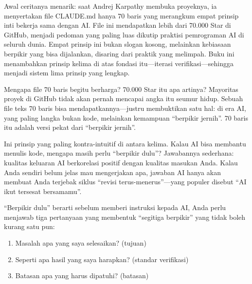 

Awal ceritanya menarik: saat Andrej Karpathy membuka proyeknya, ia menyertakan file CLAUDE.md hanya 70 baris yang merangkum empat prinsip inti bekerja sama dengan AI. File ini mendapatkan lebih dari 70.000 Star di GitHub, menjadi pedoman yang paling luas dikutip praktisi pemrograman AI di seluruh dunia. Empat prinsip ini bukan slogan kosong, melainkan kebiasaan berpikir yang bisa dijalankan, disaring dari praktik yang melimpah. Buku ini menambahkan prinsip kelima di atas fondasi itu—iterasi verifikasi—sehingga menjadi sistem lima prinsip yang lengkap.

\begin{tcbinfo}{Mengapa file 70 baris begitu berharga?}
70.000 Star itu apa artinya? Mayoritas proyek di GitHub tidak akan pernah mencapai angka itu seumur hidup. Sebuah file teks 70 baris bisa mendapatkannya—justru membuktikan satu hal: di era AI, yang paling langka bukan kode, melainkan kemampuan “berpikir jernih”. 70 baris itu adalah versi pekat dari “berpikir jernih”.

\end{tcbinfo}


Ini prinsip yang paling kontra-intuitif di antara kelima. Kalau AI bisa membantu menulis kode, mengapa masih perlu “berpikir dulu”? Jawabannya sederhana: kualitas keluaran AI berkorelasi positif dengan kualitas masukan Anda. Kalau Anda sendiri belum jelas mau mengerjakan apa, jawaban AI hanya akan membuat Anda terjebak siklus “revisi terus-menerus”—yang populer disebut “AI ikut tersesat bersamamu”.

“Berpikir dulu” berarti sebelum memberi instruksi kepada AI, Anda perlu menjawab tiga pertanyaan yang membentuk “segitiga berpikir” yang tidak boleh kurang satu pun:

\begin{enumerate}
  \item Masalah apa yang saya selesaikan? (tujuan)
  \item Seperti apa hasil yang saya harapkan? (standar verifikasi)
  \item Batasan apa yang harus dipatuhi? (batasan)
\end{enumerate}

